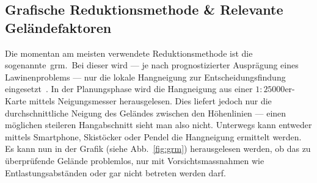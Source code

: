 

\subsection{Grafische Reduktionsmethode \& Relevante Geländefaktoren}

Die momentan am meisten verwendete Reduktionsmethode ist die sogenannte\ \acrfull{grm}.\ Bei dieser wird --- je nach prognostizierter Ausprägung eines Lawinenproblems --- nur die lokale Hangneigung zur Entscheidungsfindung eingesetzt~\cite{sacbergspwinter}. In der Planungsphase wird die Hangneigung aus einer $1:25000$er-Karte mittels Neigungsmesser herausgelesen. Dies liefert jedoch nur die durchschnittliche Neigung des Geländes zwischen den Höhenlinien --- einen möglichen steileren Hangabschnitt sieht man also nicht.
Unterwegs kann entweder mittels Smartphone, Skistöcker oder Pendel die Hangneigung ermittelt werden. Es kann nun in der Grafik (siehe Abb.\ \ref{fig:grm}) herausgelesen werden, ob das zu überprüfende Gelände problemlos, nur mit Vorsichtsmassnahmen wie Entlastungsabständen oder gar nicht betreten werden darf.

